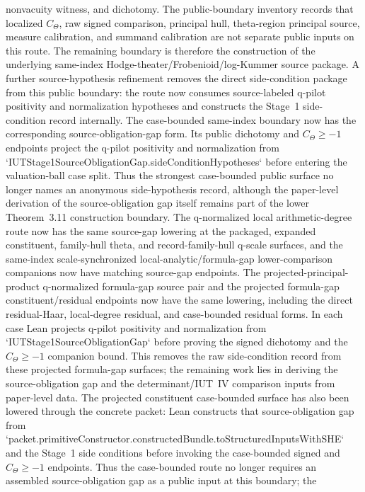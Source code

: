 \documentclass[11pt]{article}
\newcommand{\CTheta}{C_\Theta}
\theoremstyle{plain}
\theoremstyle{definition}
\theoremstyle{remark}
\begin{document}
nonvacuity witness, and dichotomy.  The public-boundary inventory records that
localized \(C_\Theta\), raw signed comparison, principal hull,
theta-region principal source, measure calibration, and summand calibration
are not separate public inputs on this route.  The remaining boundary is
therefore the construction of the underlying same-index
Hodge-theater/Frobenioid/log-Kummer source package.
A further source-hypothesis refinement
removes the direct side-condition package from this public boundary: the route
now consumes source-labeled q-pilot positivity and normalization hypotheses and
constructs the Stage~1 side-condition record internally.  The
case-bounded same-index boundary now has the corresponding
source-obligation-gap form.  Its public dichotomy and
\(\CTheta\ge -1\) endpoints project the q-pilot positivity and normalization
from `IUTStage1SourceObligationGap.sideConditionHypotheses` before entering
the valuation-ball case split.  Thus the strongest case-bounded public surface
no longer names an anonymous side-hypothesis record, although the paper-level
derivation of the source-obligation gap itself remains part of the lower
Theorem~3.11 construction boundary.
The q-normalized local arithmetic-degree route now has the same source-gap
lowering at the packaged, expanded constituent, family-hull theta, and
record-family-hull q-scale surfaces, and the same-index scale-synchronized
local-analytic/formula-gap lower-comparison companions now have matching
source-gap endpoints.  The projected-principal-product q-normalized
formula-gap source pair and the projected formula-gap constituent/residual
endpoints now have the same lowering, including the direct residual-Haar,
local-degree residual, and case-bounded residual forms.  In each case Lean
projects q-pilot positivity and normalization from
`IUTStage1SourceObligationGap` before proving the signed dichotomy and the
\(\CTheta\ge -1\) companion bound.  This removes the raw side-condition record
from these projected formula-gap surfaces; the remaining work lies in deriving
the source-obligation gap and the determinant/IUT~IV comparison inputs from
paper-level data.
The projected constituent case-bounded surface has also been lowered through
the concrete packet: Lean constructs that source-obligation gap from
`packet.primitiveConstructor.constructedBundle.toStructuredInputsWithSHE`
and the Stage~1 side conditions before invoking the case-bounded signed and
\(\CTheta\ge -1\) endpoints.  Thus the case-bounded route no longer requires
an assembled source-obligation gap as a public input at this boundary; the
\end{document}
